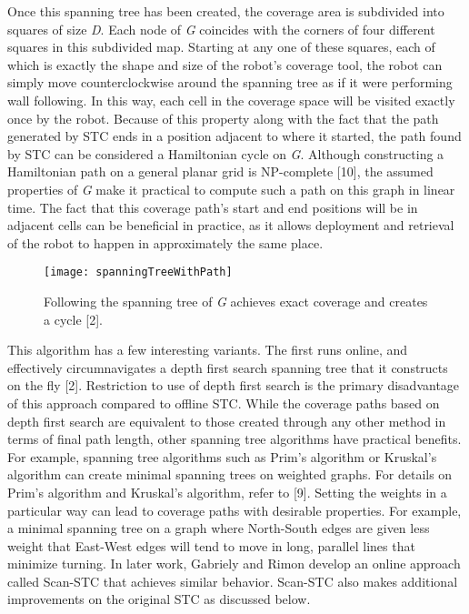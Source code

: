 Once this spanning tree has been created, the coverage area is subdivided into squares of size \textit{D}. Each node of \textit{G} coincides with the corners of four different squares in this subdivided map. Starting at any one of these squares, each of which is exactly the shape and size of the robot's coverage tool, the robot can simply move counterclockwise around the spanning tree as if it were performing wall following. In this way, each cell in the coverage space will be visited exactly once by the robot. Because of this property along with the fact that the path generated by STC ends in a position adjacent to where it started, the path found by STC can be considered a Hamiltonian cycle on \textit{G}. Although constructing a Hamiltonian path on a general planar grid is NP-complete [10], the assumed properties of \textit{G} make it practical to compute such a path on this graph in linear time. The fact that this coverage path's start and end positions will be in adjacent cells can be beneficial in practice, as it allows deployment and retrieval of the robot to happen in approximately the same place.

\begin{figure}[H]
\texttt{[image: spanningTreeWithPath]}
\caption[Spanning Tree Coverage Path]{Following the spanning tree of \textit{G} achieves exact coverage and creates a cycle [2].}
\end{figure}

This algorithm has a few interesting variants. The first runs online, and effectively circumnavigates a depth first search spanning tree that it constructs on the fly [2]. Restriction to use of depth first search is the primary disadvantage of this approach compared to offline STC. While the coverage paths based on depth first search are equivalent to those created through any other method in terms of final path length, other spanning tree algorithms have practical benefits. For example, spanning tree algorithms such as Prim's algorithm or Kruskal's algorithm can create minimal spanning trees on weighted graphs. For details on Prim's algorithm and Kruskal's algorithm, refer to [9]. Setting the weights in a particular way can lead to coverage paths with desirable properties. For example, a minimal spanning tree on a graph where North-South edges are given less weight that East-West edges will tend to move in long, parallel lines that minimize turning. In later work, Gabriely and Rimon develop an online approach called Scan-STC that achieves similar behavior. Scan-STC also makes additional improvements on the original STC as discussed below.

